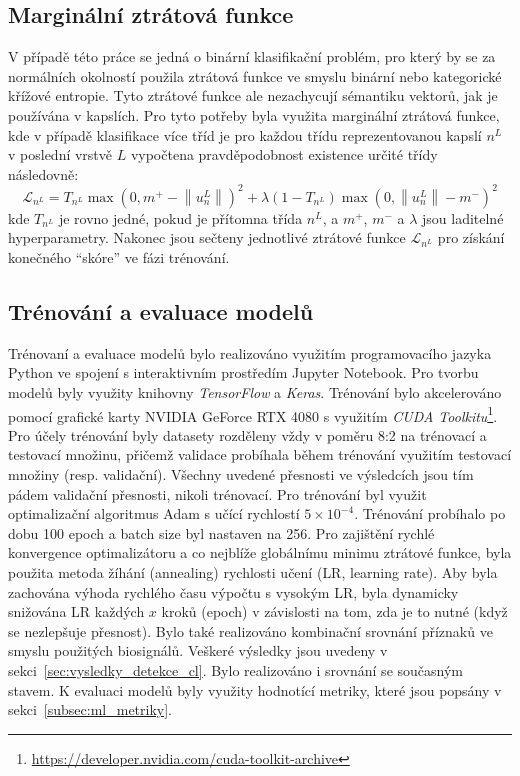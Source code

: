 \subsection{Marginální ztrátová funkce}
\label{subsec:marginalni_funkce}
V případě této práce se jedná o binární klasifikační problém, pro který by se za
normálních okolností použila ztrátová funkce ve smyslu binární nebo kategorické
křížové entropie. Tyto ztrátové funkce ale nezachycují sémantiku vektorů, jak je
používána v kapslích. Pro tyto potřeby byla využita marginální ztrátová funkce,
kde v případě klasifikace více tříd je pro každou třídu reprezentovanou kapslí
$n^L$ v poslední vrstvě $L$ vypočtena pravděpodobnost existence určité třídy
následovně:
\begin{equation}
    \mathcal{L}_{n^L}=T_{n^L} \max \left(0, m^{+}-\left\|u_n^L\right\|\right)^2+\lambda\left(1-T_{n^L}\right) \max \left(0,\left\|u_n^L\right\|-m^{-}\right)^2
\end{equation}
kde $T_{n^L}$ je rovno jedné, pokud je přítomna třída $n^L$, a $m^+$, $m^-$ a
$\lambda$ jsou laditelné hyperparametry. Nakonec jsou sečteny jednotlivé
ztrátové funkce $\mathcal{L}_{n^L}$ pro získání konečného \enquote{skóre} ve
fázi trénování.

\subsection{Trénování a evaluace modelů}
\label{subsec:trenovani_modelu}
Trénovaní a evaluace modelů bylo realizováno využitím programovacího jazyka
Python ve spojení s interaktivním prostředím Jupyter Notebook. Pro tvorbu modelů
byly využity knihovny \textit{TensorFlow} a \textit{Keras}. Trénování bylo
akcelerováno pomocí grafické karty NVIDIA GeForce RTX 4080 s využitím
\textit{CUDA Toolkitu}\footnote{\url{https://developer.nvidia.com/cuda-toolkit-archive}}. Pro
účely trénování byly datasety rozděleny vždy v poměru 8:2 na trénovací a
testovací množinu, přičemž validace probíhala během trénování využitím testovací
množiny (resp. validační). Všechny uvedené přesnosti ve výsledcích jsou tím
pádem validační přesnosti, nikoli trénovací. Pro trénování byl využit
optimalizační algoritmus Adam s učící rychlostí $5 \times 10^{-4}$. Trénování
probíhalo po dobu 100 epoch a batch size byl nastaven na 256. Pro zajištění
rychlé konvergence optimalizátoru a co nejblíže globálnímu minimu ztrátové
funkce, byla použita metoda žíhání (annealing) rychlosti učení (\gls{LR},
learning rate). Aby byla zachována výhoda rychlého času výpočtu s vysokým
\gls{LR}, byla dynamicky snižována \gls{LR} každých $x$ kroků (epoch) v
závislosti na tom, zda je to nutné (když se nezlepšuje přesnost). Bylo také
realizováno kombinační srovnání příznaků ve smyslu použitých biosignálů. Veškeré
výsledky jsou uvedeny v sekci~\ref{sec:vysledky_detekce_cl}. Bylo realizováno i
srovnání se současným stavem. K evaluaci modelů byly využity hodnotící metriky,
které jsou popsány v sekci~\ref{subsec:ml_metriky}.